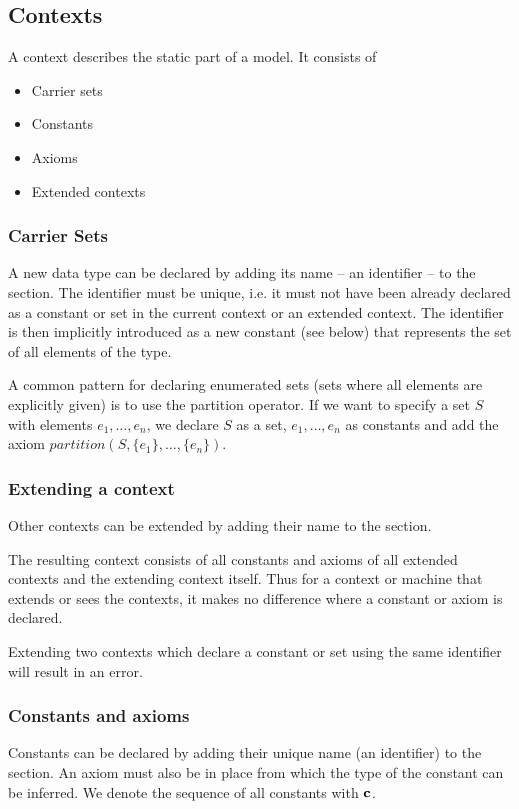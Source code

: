 \subsection{Contexts}
\label{context}

A context describes the static part of a model. It consists of
\begin{itemize}
\item Carrier sets
\item Constants
\item Axioms
\item Extended contexts
\end{itemize}

\subsubsection{Carrier Sets}
\label{carrier_sets}
A new data type can be declared by adding its name -- an identifier -- to the  section.
The identifier must be unique, i.e. it must not have been already declared as a constant or set in the current context or an extended context.
The identifier is then implicitly introduced as a new constant (see below) that represents the set of all elements of the type. 

A common pattern for declaring enumerated sets (sets where all elements are explicitly given)
is to use the partition operator. If we want to specify a set $S$ with elements $e_1,\ldots,e_n$,
we declare $S$ as a set, $e_1,\ldots,e_n$ as constants and add the axiom $partition(S,\{e_1\},\ldots,\{e_n\})$.

\subsubsection{Extending a context}
\label{extendind_a_context}
Other contexts can be extended by adding their name to the  section.

The resulting context consists of all constants and axioms of all extended contexts and the extending context itself.
Thus for a context or machine that extends or sees the contexts, it makes no difference where a constant or axiom is declared.

Extending two contexts which declare a constant or set using the same identifier will result in an error.

\subsubsection{Constants and axioms}
\label{constants_and_axioms}
Constants can be declared by adding their unique name (an identifier) to the  section.
An axiom must also be in place from which the type of the constant can be inferred.
We denote the sequence of all constants with $\mathbf{c}$.

